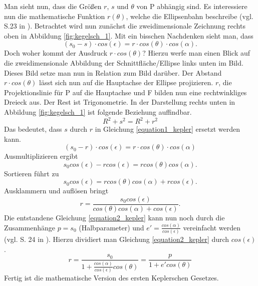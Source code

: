\newpar
Man sieht nun, dass die Größen \ensuremath{r}, \ensuremath{s} und \ensuremath{\theta} von P abhängig sind. Es interessiere nun die mathematische Funktion \ensuremath{r(\theta)}, welche die Ellipsenbahn beschreibe (vgl. S.23 in \cite{Raumflugm}). Betrachtet wird nun zunächst die zweidimensionale Zeichnung rechts oben in Abbildung \ref{fig:kegelsch_1}. Mit ein bisschen Nachdenken sieht man, dass
\begin{equation}
	(s_0-s) \cdot cos(\epsilon) = r \cdot cos (\theta) \cdot cos(\alpha).
	\label{equation1_kepler}
\end{equation} 
Doch woher kommt der Ausdruck \ensuremath{r \cdot cos(\theta)}? Hierzu werfe man einen Blick auf die zweidimensionale Abbildung der Schnittfläche/Ellipse links unten im Bild. Dieses Bild setze man nun in Relation zum Bild darüber. Der Abstand \ensuremath{r \cdot cos(\theta)} lässt sich nun auf die Hauptachse der Ellipse projizieren. \ensuremath{r}, die Projektionslinie für P auf die Hauptachse und F bilden nun eine rechtwinkliges Dreieck aus. Der Rest ist Trigonometrie. 
\newpar
In der Darstellung rechts unten in Abbildung \ref{fig:kegelsch_1} ist folgende Beziehung auffindbar. 
\begin{equation}
 R^2 + s^2 = R^2 + r^2
\end{equation} 
Das bedeutet, dass \ensuremath{s} durch \ensuremath{r} in Gleichung \ref{equation1_kepler} ersetzt werden kann. 
\begin{equation}
	(s_0-r) \cdot cos(\epsilon) = r \cdot cos (\theta) \cdot cos(\alpha)
\end{equation}
Ausmultiplizieren ergibt
\begin{equation}
s_0 cos(\epsilon) - r cos(\epsilon) = r cos (\theta) cos(\alpha).
\end{equation}
Sortieren führt zu 
\begin{equation}
s_0 cos(\epsilon) = r cos (\theta) cos(\alpha) + r cos(\epsilon).
\end{equation}
Ausklammern und auflösen bringt
\begin{equation}
	r = \frac{s_0 cos(\epsilon) }{cos (\theta) cos(\alpha) + cos(\epsilon)}.
		\label{equation2_kepler}
\end{equation}
Die entstandene Gleichung \ref{equation2_kepler} kann nun noch durch die Zusammenhänge \ensuremath{p=s_0} (Halbparameter) und \ensuremath{e'=\frac{cos(\alpha)}{cos(\epsilon)}} vereinfacht werden (vgl. S. 24 in \cite{Raumflugm}). Hierzu dividiert man Gleichung \ref{equation2_kepler} durch \ensuremath{cos(\epsilon)}. 
\begin{equation}
r = \frac{s_0}{1+\frac{cos(\alpha)}{cos(\epsilon)}cos (\theta)} = \frac{p}{1 + e' cos(\theta)} 
\label{equation3_kepler}
\end{equation}
Fertig ist die mathematische Version des ersten Keplerschen Gesetzes. 


